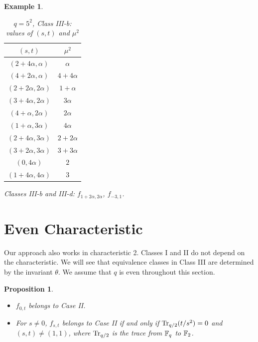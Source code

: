\documentclass{amsart}
\newtheorem{prop}[thm]{Proposition}
\newtheorem{exmp}[thm]{Example}
\numberwithin{equation}{section}
\theoremstyle{definition}
\newcommand{\f}{\Bbb F}
\newcommand{\A}{\alpha}
\begin{document}
\begin{exmp}
\begin{table}[ht]
\caption{$q=5^2$, Class III-b: values of $(s,t)$ and $\mu^2$}\label{tb:5^2-case3b}
   \renewcommand*{\arraystretch}{1.4}
    \centering
     \begin{tabular}{c|c}
         \hline
         $(s,t)$ & $\mu^2$ \\ \hline
         $(2+4\A, \A)$ & $\A$ \\
         $(4+2\A,\A)$ & $4+4\A$ \\
         $(2+2\A,2\A)$& $1+ \A$ \\
         $(3+4\A,2\A)$& $3\A$ \\
         $(4+\A,2\A)$& $2\A$ \\
         $(1+\A,3\A)$& $4\A$ \\
         $(2+4\A,3\A)$& $2+2\A$ \\
         $(3+2\A,3\A)$& $3+3 \A$ \\
         $(0,4\A)$& $2$ \\
         $(1+4\A,4\A)$& $3$ \\\hline
     \end{tabular}
\end{table}


\medskip
Classes III-b and III-d: $f_{1+2\alpha,2\alpha}$, $f_{-3,1}$.

\end{exmp}




\appendix 
\section{Even Characteristic}\label{app-a}

Our approach also works in characteristic 2. Classes I and II do not depend on the characteristic. We will see that equivalence classes in Class III are determined by the invariant $\theta$. We assume that $q$ is even throughout this section. 

\begin{prop}\label{prop:p=2}\
\begin{itemize}
\item[(i)]
$f_{0,t}$ belongs to Case II.

\medskip
\item[(ii)] For $s\ne 0$, $f_{s,t}$ belongs to Case II if and only if $\text{\rm Tr}_{q/2}(t/s^2)=0$ and $(s,t)\ne (1,1)$, where $\text{\rm Tr}_{q/2}$ is the trace from $\f_q$ to $\f_2$. 
\end{itemize}
\end{prop}
\end{document}
